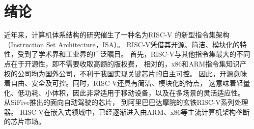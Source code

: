 \chapter{绪论}






近年来，计算机体系结构的研究催生了一种名为RISC-V\cite{asanovic2014instruction}
的新型指令集架构（Instruction Set Architecture，ISA）。
RISC-V凭借其开源、简洁、模块化的特性，受到了学术界和工业界的广泛瞩目。
首先，RISC-V与其他指令集最大的不同点在于开源性，即不需要收取高额的版权费，
相对的，x86和ARM指令集知识产权的公司均为国外公司，不利于我国实现关键芯片的自主可控。
因此，开源意味着自由、安全及可控。同时，RISC-V还具有简洁、模块化的特点，
这意味着轻量化、低功耗、小体积，因此非常适用于移动设备，以及在多场景的灵活适应性。
从SiFive推出的面向自动驾驶的芯片\cite{sifive-automotive}，
到阿里巴巴达摩院的玄铁RISC-V系列处理器\cite{xuantie}。
RISC-V在嵌入式领域中，已经逐渐进入由ARM、x86等主流计算机架构垄断的芯片市场。

